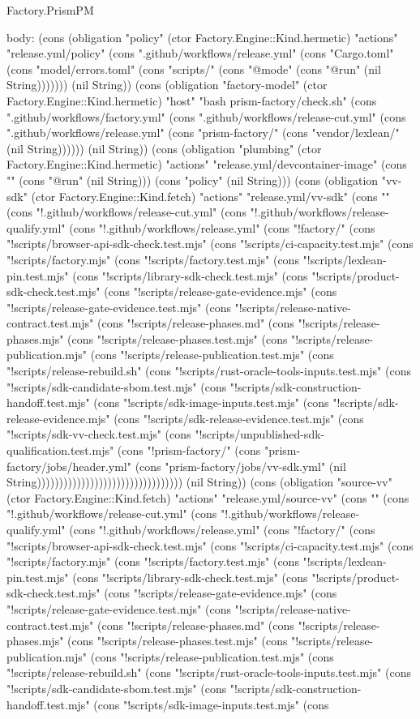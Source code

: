 \begin{lexlean}{Factory.PrismPM}
\begin{semanticmodule}
{  body: (cons (obligation "policy" (ctor Factory.Engine::Kind.hermetic) "actions" "release.yml/policy" (cons ".github/workflows/release.yml" (cons "Cargo.toml" (cons "model/errors.toml" (cons "scripts/" (cons "@mode" (cons "@run" (nil String))))))) (nil String)) (cons (obligation "factory-model" (ctor Factory.Engine::Kind.hermetic) "host" "bash prism-factory/check.sh" (cons ".github/workflows/factory.yml" (cons ".github/workflows/release-cut.yml" (cons ".github/workflows/release.yml" (cons "prism-factory/" (cons "vendor/lexlean/" (nil String)))))) (nil String)) (cons (obligation "plumbing" (ctor Factory.Engine::Kind.hermetic) "actions" "release.yml/devcontainer-image" (cons "" (cons "@run" (nil String))) (cons "policy" (nil String))) (cons (obligation "vv-sdk" (ctor Factory.Engine::Kind.fetch) "actions" "release.yml/vv-sdk" (cons "" (cons "!.github/workflows/release-cut.yml" (cons "!.github/workflows/release-qualify.yml" (cons "!.github/workflows/release.yml" (cons "!factory/" (cons "!scripts/browser-api-sdk-check.test.mjs" (cons "!scripts/ci-capacity.test.mjs" (cons "!scripts/factory.mjs" (cons "!scripts/factory.test.mjs" (cons "!scripts/lexlean-pin.test.mjs" (cons "!scripts/library-sdk-check.test.mjs" (cons "!scripts/product-sdk-check.test.mjs" (cons "!scripts/release-gate-evidence.mjs" (cons "!scripts/release-gate-evidence.test.mjs" (cons "!scripts/release-native-contract.test.mjs" (cons "!scripts/release-phases.md" (cons "!scripts/release-phases.mjs" (cons "!scripts/release-phases.test.mjs" (cons "!scripts/release-publication.mjs" (cons "!scripts/release-publication.test.mjs" (cons "!scripts/release-rebuild.sh" (cons "!scripts/rust-oracle-tools-inputs.test.mjs" (cons "!scripts/sdk-candidate-sbom.test.mjs" (cons "!scripts/sdk-construction-handoff.test.mjs" (cons "!scripts/sdk-image-inputs.test.mjs" (cons "!scripts/sdk-release-evidence.mjs" (cons "!scripts/sdk-release-evidence.test.mjs" (cons "!scripts/sdk-vv-check.test.mjs" (cons "!scripts/unpublished-sdk-qualification.test.mjs" (cons "!prism-factory/" (cons "prism-factory/jobs/header.yml" (cons "prism-factory/jobs/vv-sdk.yml" (nil String))))))))))))))))))))))))))))))))) (nil String)) (cons (obligation "source-vv" (ctor Factory.Engine::Kind.fetch) "actions" "release.yml/source-vv" (cons "" (cons "!.github/workflows/release-cut.yml" (cons "!.github/workflows/release-qualify.yml" (cons "!.github/workflows/release.yml" (cons "!factory/" (cons "!scripts/browser-api-sdk-check.test.mjs" (cons "!scripts/ci-capacity.test.mjs" (cons "!scripts/factory.mjs" (cons "!scripts/factory.test.mjs" (cons "!scripts/lexlean-pin.test.mjs" (cons "!scripts/library-sdk-check.test.mjs" (cons "!scripts/product-sdk-check.test.mjs" (cons "!scripts/release-gate-evidence.mjs" (cons "!scripts/release-gate-evidence.test.mjs" (cons "!scripts/release-native-contract.test.mjs" (cons "!scripts/release-phases.md" (cons "!scripts/release-phases.mjs" (cons "!scripts/release-phases.test.mjs" (cons "!scripts/release-publication.mjs" (cons "!scripts/release-publication.test.mjs" (cons "!scripts/release-rebuild.sh" (cons "!scripts/rust-oracle-tools-inputs.test.mjs" (cons "!scripts/sdk-candidate-sbom.test.mjs" (cons "!scripts/sdk-construction-handoff.test.mjs" (cons "!scripts/sdk-image-inputs.test.mjs" (cons }
\end{semanticmodule}
\end{lexlean}
